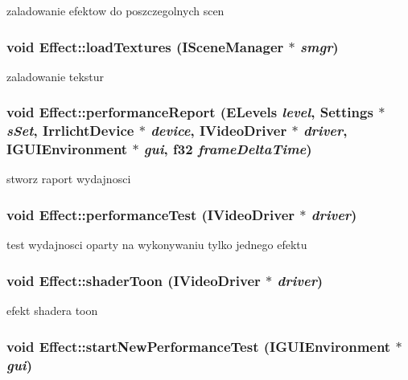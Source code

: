 \label{class_effect_a3e8b0debd6152954a2292bc163c801de}
zaladowanie efektow do poszczegolnych scen \hypertarget{class_effect_a7145e981ce52d1c0caa8431e6127dd0b}{
\subsubsection[{loadTextures}]{\setlength{\rightskip}{0pt plus 5cm}void Effect::loadTextures (ISceneManager $\ast$ {\em smgr})}}
\label{class_effect_a7145e981ce52d1c0caa8431e6127dd0b}
zaladowanie tekstur \hypertarget{class_effect_a90a620faa6c94182f28006f40a110ab5}{
\subsubsection[{performanceReport}]{\setlength{\rightskip}{0pt plus 5cm}void Effect::performanceReport (ELevels {\em level}, \/  {\bf Settings} $\ast$ {\em sSet}, \/  IrrlichtDevice $\ast$ {\em device}, \/  IVideoDriver $\ast$ {\em driver}, \/  IGUIEnvironment $\ast$ {\em gui}, \/  f32 {\em frameDeltaTime})}}
\label{class_effect_a90a620faa6c94182f28006f40a110ab5}
stworz raport wydajnosci \hypertarget{class_effect_aea40ea8492461bdfbce75a4375dae68e}{
\subsubsection[{performanceTest}]{\setlength{\rightskip}{0pt plus 5cm}void Effect::performanceTest (IVideoDriver $\ast$ {\em driver})}}
\label{class_effect_aea40ea8492461bdfbce75a4375dae68e}
test wydajnosci oparty na wykonywaniu tylko jednego efektu \hypertarget{class_effect_a6843e6c87adeedd53ab7b16f87583169}{
\subsubsection[{shaderToon}]{\setlength{\rightskip}{0pt plus 5cm}void Effect::shaderToon (IVideoDriver $\ast$ {\em driver})}}
\label{class_effect_a6843e6c87adeedd53ab7b16f87583169}
efekt shadera toon \hypertarget{class_effect_a47bc7316ae643fa6daa5d196327ec3c1}{
\subsubsection[{startNewPerformanceTest}]{\setlength{\rightskip}{0pt plus 5cm}void Effect::startNewPerformanceTest (IGUIEnvironment $\ast$ {\em gui})}}
